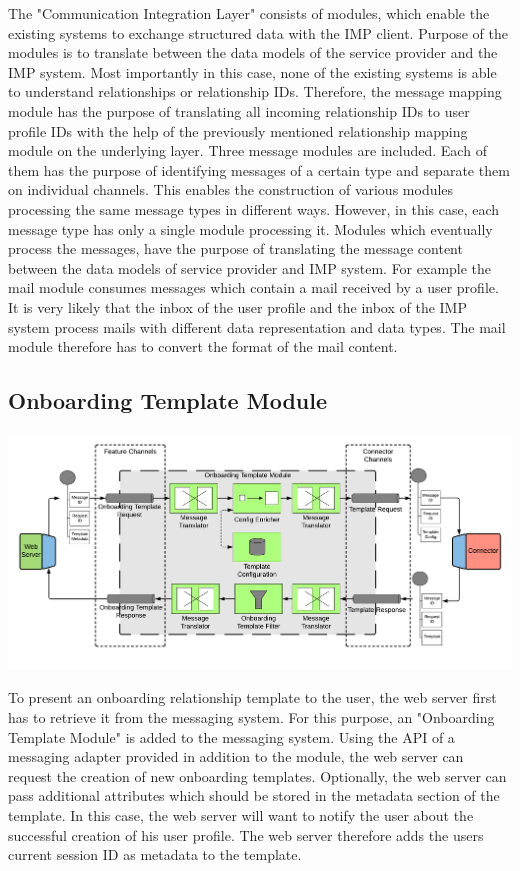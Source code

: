 The "Communication Integration Layer" consists of modules, which enable the existing systems to exchange structured data with the IMP client. Purpose of the modules is to translate between the data models of the service provider and the IMP system. Most importantly in this case, none of the existing systems is able to understand relationships or relationship IDs. Therefore, the message mapping module has the purpose of translating all incoming relationship IDs to user profile IDs with the help of the previously mentioned relationship mapping module on the underlying layer. Three message modules are included. Each of them has the purpose of identifying messages of a certain type and separate them on individual channels. This enables the construction of various modules processing the same message types in different ways. However, in this case, each message type has only a single module processing it. Modules which eventually process the messages, have the purpose of translating the message content between the data models of service provider and IMP system. For example the mail module consumes messages which contain a mail received by a user profile. It is very likely that the inbox of the user profile and the inbox of the IMP system process mails with different data representation and data types. The mail module therefore has to convert the format of the mail content.

\subsection{Onboarding Template Module}

\begin{center}
    \includegraphics[scale=0.6]{Diagrams/Integration Architecture 1/Technological Integration/6. Onboarding Template Module.pdf}
\end{center}

To present an onboarding relationship template to the user, the web server first has to retrieve it from the messaging system. For this purpose, an "Onboarding Template Module" is added to the messaging system. Using the API of a messaging adapter provided in addition to the module, the web server can request the creation of new onboarding templates. Optionally, the web server can pass additional attributes which should be stored in the metadata section of the template. In this case, the web server will want to notify the user about the successful creation of his user profile. The web server therefore adds the users current session ID as metadata to the template.

